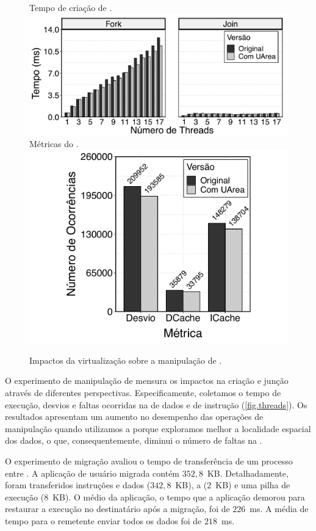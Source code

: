 \begin{figure}[b]
	\centering
                   {Tempo de criação de \threads.}
                   {\includegraphics[width=\textwidth]{content/images/fork-join-kernel-time-bars.pdf}}
	\qquad
                   {Métricas do .}
                   {\includegraphics[width=\textwidth]{content/images/fork-join-kernel-counters.pdf}}
	\caption{Impactos da virtualização sobre a manipulação de \threads.\label{fig.threads}}%
\end{figure}

O experimento de manipulação de \threads mensura os impactos na criação e junção através de diferentes perspectivas. Especificamente, coletamos o tempo de execução, desvios e faltas ocorridas na \cache de dados e de instrução (\autoref{fig.threads}).
Os resultados apresentam um aumento no desempenho das operações de manipulação quando utilizamos a \uarea porque exploramos melhor a localidade espacial dos dados, o que, consequentemente, diminui o número de faltas na \cache.

O experimento de migração avaliou o tempo de transferência de um processo entre \clusters.
A aplicação de usuário migrada contém $352,8$~KB. Detalhadamente, foram transferidos instruções e dados ($342,8$~KB), a \uarea ($2$~KB) e uma pilha de execução ($8$~KB). O \downtime médio da aplicação, \ie o tempo que a aplicação demorou para restaurar a execução no \cluster destinatário após a migração, foi de $226$~ms. A média de tempo para o \cluster remetente enviar todos os dados foi de $218$~ms.
